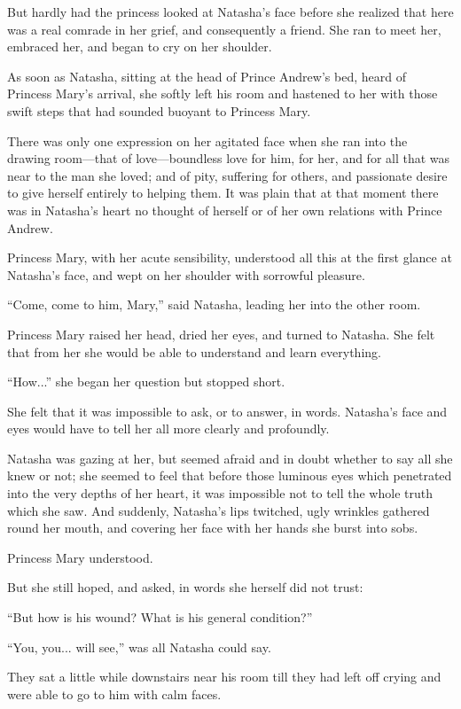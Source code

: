 But hardly had the princess looked at Natasha's face before she
realized that here was a real comrade in her grief, and
consequently a friend.  She ran to meet her, embraced her, and
began to cry on her shoulder.

As soon as Natasha, sitting at the head of Prince Andrew's bed,
heard of Princess Mary's arrival, she softly left his room and
hastened to her with those swift steps that had sounded buoyant
to Princess Mary.

There was only one expression on her agitated face when she ran
into the drawing room---that of love---boundless love for him,
for her, and for all that was near to the man she loved; and of
pity, suffering for others, and passionate desire to give herself
entirely to helping them. It was plain that at that moment there
was in Natasha's heart no thought of herself or of her own
relations with Prince Andrew.

Princess Mary, with her acute sensibility, understood all this at
the first glance at Natasha's face, and wept on her shoulder with
sorrowful pleasure.

``Come, come to him, Mary,'' said Natasha, leading her into the
other room.

Princess Mary raised her head, dried her eyes, and turned to
Natasha.  She felt that from her she would be able to understand
and learn everything.

``How...'' she began her question but stopped short.

She felt that it was impossible to ask, or to answer, in words.
Natasha's face and eyes would have to tell her all more clearly
and profoundly.

Natasha was gazing at her, but seemed afraid and in doubt whether
to say all she knew or not; she seemed to feel that before those
luminous eyes which penetrated into the very depths of her heart,
it was impossible not to tell the whole truth which she saw. And
suddenly, Natasha's lips twitched, ugly wrinkles gathered round
her mouth, and covering her face with her hands she burst into
sobs.

Princess Mary understood.

But she still hoped, and asked, in words she herself did not
trust:

``But how is his wound? What is his general condition?''

``You, you... will see,'' was all Natasha could say.

They sat a little while downstairs near his room till they had
left off crying and were able to go to him with calm faces.

